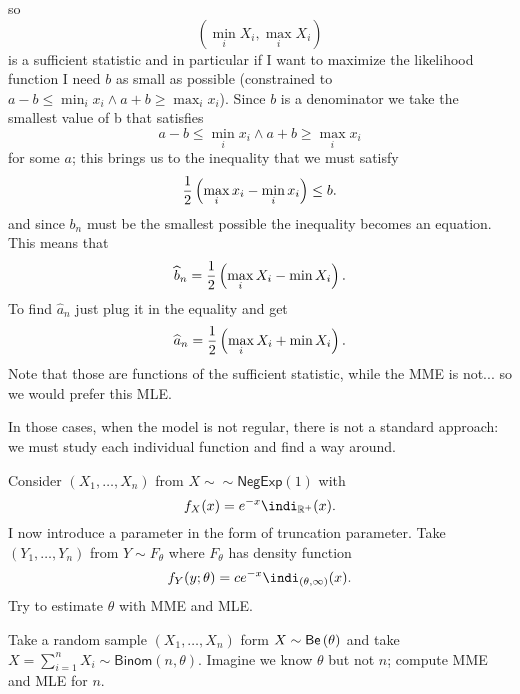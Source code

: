 \documentclass[12pt]{report}
\begin{document}
so 
\begin{equation*}
	\left(\min_{i}X_{i},\max_{i}X_{i}\right)
\end{equation*}
is a sufficient statistic and in particular if I want to maximize the likelihood function I need $b$ as small as possible (constrained to $a-b\leq\min_{i}x_{i}\wedge a+b\geq\max_{i}x_{i}$). Since $b$ is a denominator we take the smallest value of b that satisfies
\begin{equation*}
	a-b\leq\min_{i}x_{i}\wedge a+b\geq\max_{i}x_{i}
\end{equation*}
for some $a$; this brings us to the inequality that we must satisfy
\begin{equation*}
	\frac{1}{2}\left(\max_{i}x_{i}-\min_{i}x_{i}\right)\leq b.
\end{equation*}
and since $b_{n}$ must be the smallest possible the inequality becomes an equation. This means that
\begin{equation*}
	\widehat{b}_{n}=\frac{1}{2}\left(\max_{i}X_{i}-\min X_{i}\right).
\end{equation*}
To find $\widehat{a}_{n}$ just plug it in the equality and get
\begin{equation*}
	\widehat{a}_{n}=\frac{1}{2}\left(\max_{i}X_{i}+\min X_{i}\right).
\end{equation*}
Note that those are functions of the sufficient statistic, while the MME is not... so we would prefer this MLE.
\begin{remark}
	In those cases, when the model is not regular, there is not a standard approach: we must study each individual function and find a way around. 
\end{remark}
\begin{exercise}
	Consider $(X_{1},\ldots,X_{n})$ from $X\sim\sim\mathsf{NegExp}(1)$ with
	\begin{equation*}
		f_{X}(x)=e^{-x}\indi_{\R^{+}}(x).
	\end{equation*}
	I now introduce a parameter in the form of truncation parameter. Take $(Y_{1},\ldots,Y_{n})$ from $Y\sim F_{\theta}$ where $F_{\theta}$ has density function
	\begin{equation*}
		f_{Y}(y;\theta)=ce^{-x}\indi_{(\theta,\infty)}(x).
	\end{equation*}
	Try to estimate $\theta$ with MME and MLE.
\end{exercise}
\begin{exercise}
	Take a random sample $(X_{1},\ldots,X_{n})$ form $X\sim\mathsf{Be}\left(\theta\right)$ and take $X=\sum_{i=1}^{n}X_{i}\sim\mathsf{Binom}(n,\theta)$. Imagine we know $\theta$ but not $n$; compute MME and MLE for $n$.
\end{exercise}

\end{document}
